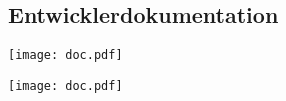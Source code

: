 \subsection{Entwicklerdokumentation}
\label{app:Doc}
\begin{center}
\texttt{[image: doc.pdf]}

\texttt{[image: doc.pdf]}
\end{center}
